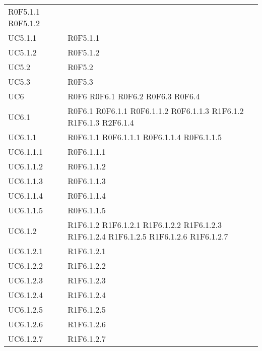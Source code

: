 \begin{longtable}{p{2.5cm}!{\VRule[1pt]}p{5.5cm}}
	\newline R0F5.1.1
	\newline R0F5.1.2\\	
UC5.1.1 & R0F5.1.1\\
UC5.1.2 & R0F5.1.2\\
UC5.2 & R0F5.2\\
UC5.3 & R0F5.3\\
UC6 & R0F6
	\newline R0F6.1
	\newline R0F6.2
	\newline R0F6.3
	\newline R0F6.4\\
UC6.1 & R0F6.1
	\newline R0F6.1.1
	\newline R0F6.1.1.2
	\newline R0F6.1.1.3
	\newline R1F6.1.2
	\newline R1F6.1.3
	\newline R2F6.1.4\\
UC6.1.1 & R0F6.1.1
	\newline R0F6.1.1.1
	\newline R0F6.1.1.4
	\newline R0F6.1.1.5\\
UC6.1.1.1 & R0F6.1.1.1\\
UC6.1.1.2 & R0F6.1.1.2\\
UC6.1.1.3 & R0F6.1.1.3\\
UC6.1.1.4 & R0F6.1.1.4\\
UC6.1.1.5 & R0F6.1.1.5\\
UC6.1.2 & R1F6.1.2
	\newline R1F6.1.2.1
	\newline R1F6.1.2.2
	\newline R1F6.1.2.3
	\newline R1F6.1.2.4
	\newline R1F6.1.2.5
	\newline R1F6.1.2.6
	\newline R1F6.1.2.7\\
UC6.1.2.1 & R1F6.1.2.1\\
UC6.1.2.2 & R1F6.1.2.2\\
UC6.1.2.3 & R1F6.1.2.3\\
UC6.1.2.4 & R1F6.1.2.4\\
UC6.1.2.5 & R1F6.1.2.5\\
UC6.1.2.6 & R1F6.1.2.6\\
UC6.1.2.7 & R1F6.1.2.7\\

\end{longtable}
